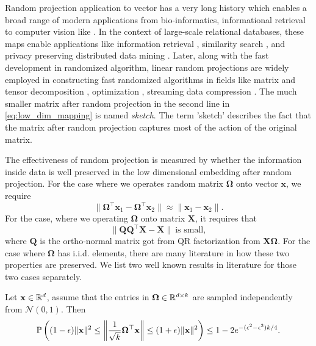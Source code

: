 Random projection application to vector has a very long history which enables a broad range of modern applications from bio-informatics, informational retrieval to computer vision like \cite{wright2009robust,buhler2002finding,allen2014sparse,bingham2001random,fradkin2003experiments, halko2011finding, wang2012semi, jegou2008hamming}. In the context of large-scale relational databases, these maps enable
applications like information retrieval \cite{papadimitriou2000latent},
similarity search \cite{sahin2005prism,kaski1998dimensionality},
and privacy preserving distributed data mining \cite{liu2006random}. 
Later, along with the fast development in randomized algorithm, linear random projections are widely employed in constructing fast randomized algorithms in fields like matrix and tensor decomposition \cite{woolfe2008fast, tropp2017practical}, optimization \cite{yurtsever2017sketchy}, streaming data compression \cite{Tropp2019-SketchingScientificSimulation, sun2019low}. The much smaller matrix after random projection in the second line in \eqref{eq:low_dim_mapping} is named \emph{sketch}.  
The term 'sketch' describes the fact that the matrix after random projection captures most of the action of the original matrix.  \par 
The effectiveness of random projection is measured by whether the information inside data is well preserved in the low dimensional embedding after random projection. For the case where we operates random matrix $\mathbf{\Omega}$ onto vector $\mathbf{x}$, we require 
\begin{equation}
\|\mathbf{\Omega}^\top\mathbf{x}_1 - \mathbf{\Omega}^\top\mathbf{x}_2\| \approx 
\|\mathbf{x}_1 -\mathbf{x}_2\|.
\end{equation}
For the case, where we operating $\mathbf{\Omega}$ onto matrix $\mathbf{X}$, it requires that
\begin{equation}
\|\mathbf{QQ}^\top \mathbf{X} - \mathbf{X}\| ~ \text{is small}, 
\end{equation}
where $\mathbf{Q}$ is the ortho-normal matrix got from QR factorization from $\mathbf{X\Omega}$.
For the case where $\mathbf{\Omega}$ has i.i.d. elements, there are many literature in how these two properties are preserved. We list two well known results in literature for those two cases separately.  
\begin{lem}
	\label{lem:gauss-rp-vector}
	Let $\mathbf{x} \in \mathbb{R}^d$, assume that the entries in $\mathbf{\Omega}\in \mathbb{R}^{d\times k}$ are sampled independently from $\mathcal{N}(0, 1)$. Then
	\begin{equation}
	\label{eq:gauss_random_projection}
	\mathbb{P}\left((1-\epsilon)\|\mathbf{x}\|^2 \le \left\|\frac{1}{\sqrt{k}} \mathbf{\Omega}^\top \mathbf{x}\right\|\le (1+\epsilon)\|\mathbf{x}\|^2\right)\le 1 - 2e^{-(\epsilon^2-\epsilon^3)k/4}.
	\end{equation}
\end{lem}

